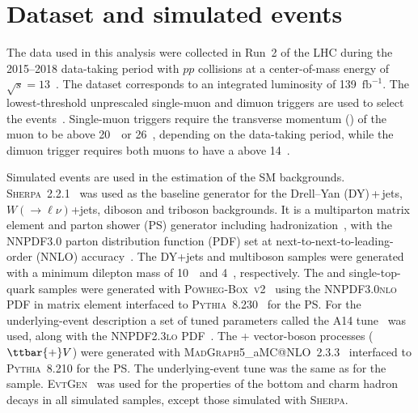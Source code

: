 \documentclass[cernpreprint, backref=false, texlive=2020, UKenglish, dvipsnames, block=none, texmf]{atlasdoc}
\begin{document}
 
 
\section{Dataset and simulated events}
 
The data used in this analysis were collected in Run~2 of the LHC during the 2015--2018 data-taking period with $pp$ collisions at a center-of-mass energy of $\sqrt{s} = 13$~\TeV. The dataset corresponds to an integrated luminosity of 139~$\text{fb}^{-1}$.
The lowest-threshold unprescaled single-muon and dimuon triggers are used to select the events~\cite{TRIG-2018-01}. Single-muon triggers require the transverse momentum (\pT) of the muon  to be above 20~\GeV\ or 26~\GeV, depending on the data-taking period, while the dimuon trigger requires both muons to have a \pT above 14~\GeV.
 
Simulated events are used in the estimation of the SM backgrounds. \textsc{Sherpa}~2.2.1~\cite{Gleisberg:2008ta,Bothmann:2019yzt} was used as the baseline generator for the Drell--Yan (DY)\,+\,jets, $W(\rightarrow \ell \nu)$+jets, diboson and triboson backgrounds. It is a multiparton matrix element and parton shower (PS) generator including hadronization~\cite{Schumann:2007mg,Hoeche:2011fd, Hoeche:2012yf, Catani:2001cc,Hoeche:2009rj}, with the \textsc{NNPDF3.0} parton distribution function (PDF) set at next-to-next-to-leading-order (NNLO) accuracy~\cite{Ball:2014uwa}.
The DY+jets and multiboson samples were generated with a minimum dilepton mass of 10~\GeV\ and 4~\GeV, respectively.
The \ttbar and single-top-quark samples were generated with \textsc{Powheg-Box~v2}~\cite{Frixione:2007vw,Nason:2004rx,Alioli:2010xd,Frixione:2007nw,Re:2010bp} using the \textsc{NNPDF3.0nlo} PDF in matrix element interfaced to \textsc{Pythia~8.230}~\cite{Sjostrand:2014zea} for the PS.
For the underlying-event description a set of tuned parameters called the \textsc{A14} tune~\cite{A14_article} was used, along with the \textsc{NNPDF2.3lo} PDF~\cite{Ball:2012cx}.
The \ttbar + vector-boson processes ($\ttbar{+}V$) were generated with \textsc{MadGraph5}\_aMC@NLO~2.3.3~\cite{Alwall:2014hca} interfaced to \textsc{Pythia}~8.210 for the PS. The underlying-event tune was the same as for the \ttbar sample.
\textsc{EvtGen}~\cite{Lange:2001uf} was used for the properties of the bottom and charm hadron decays in all simulated samples, except those simulated with \textsc{Sherpa}.
 
\end{document}
